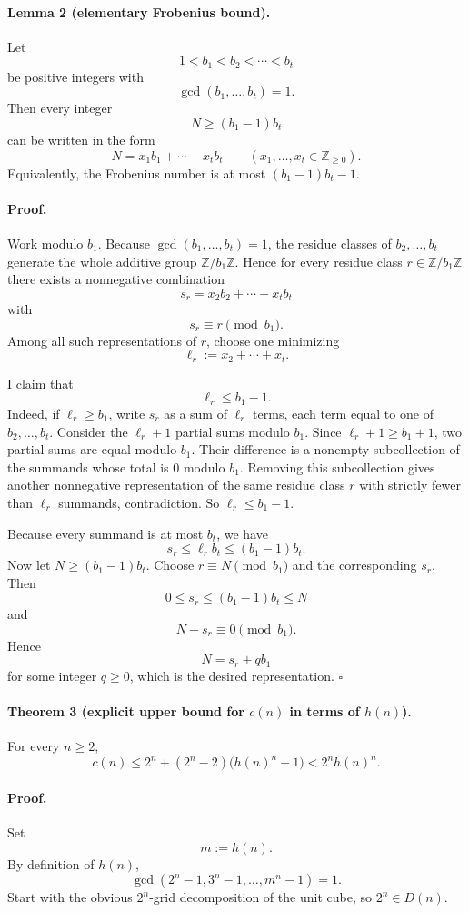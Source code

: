 \paragraph{Lemma 2 (elementary Frobenius bound).}
Let
\[
1<b_1<b_2<\cdots<b_t
\]
be positive integers with
\[
\gcd(b_1,\dots,b_t)=1.
\]
Then every integer
\[
N\ge (b_1-1)b_t
\]
can be written in the form
\[
N=x_1b_1+\cdots+x_t b_t
\qquad (x_1,\dots,x_t\in \mathbb Z_{\ge 0}).
\]
Equivalently, the Frobenius number is at most $(b_1-1)b_t-1$.

\paragraph{Proof.}
Work modulo $b_1$.
Because $\gcd(b_1,\dots,b_t)=1$, the residue classes of $b_2,\dots,b_t$ generate the whole additive group $\mathbb Z/b_1\mathbb Z$.
Hence for every residue class $r\in \mathbb Z/b_1\mathbb Z$ there exists a nonnegative combination
\[
s_r=x_2b_2+\cdots+x_t b_t
\]
with
\[
s_r\equiv r \pmod{b_1}.
\]
Among all such representations of $r$, choose one minimizing
\[
\ell_r:=x_2+\cdots+x_t.
\]

I claim that
\[
\ell_r\le b_1-1.
\]
Indeed, if $\ell_r\ge b_1$, write $s_r$ as a sum of $\ell_r$ terms, each term equal to one of $b_2,\dots,b_t$.
Consider the $\ell_r+1$ partial sums modulo $b_1$.
Since $\ell_r+1\ge b_1+1$, two partial sums are equal modulo $b_1$.
Their difference is a nonempty subcollection of the summands whose total is $0$ modulo $b_1$.
Removing this subcollection gives another nonnegative representation of the same residue class $r$ with strictly fewer than $\ell_r$ summands, contradiction.
So $\ell_r\le b_1-1$.

Because every summand is at most $b_t$, we have
\[
s_r\le \ell_r b_t\le (b_1-1)b_t.
\]
Now let $N\ge (b_1-1)b_t$.
Choose $r\equiv N\pmod{b_1}$ and the corresponding $s_r$.
Then
\[
0\le s_r\le (b_1-1)b_t\le N
\]
and
\[
N-s_r\equiv 0\pmod{b_1}.
\]
Hence
\[
N=s_r+q b_1
\]
for some integer $q\ge 0$, which is the desired representation.
\hfill$\square$

\paragraph{Theorem 3 (explicit upper bound for $c(n)$ in terms of $h(n)$).}
For every $n\ge 2$,
\[
c(n)\le 2^n+(2^n-2)\bigl(h(n)^n-1\bigr)<2^n h(n)^n.
\]

\paragraph{Proof.}
Set
\[
m:=h(n).
\]
By definition of $h(n)$,
\[
\gcd(2^n-1,3^n-1,\dots,m^n-1)=1.
\]
Start with the obvious $2^n$-grid decomposition of the unit cube, so $2^n\in D(n)$.

